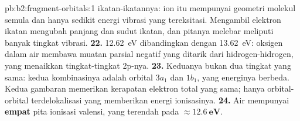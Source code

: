 \begin{solution}{pb:b2:fragment-orbitals:1}
ikatan-ikatannya: ion itu mempunyai geometri molekul semula dan hanya
sedikit energi vibrasi yang tereksitasi. Mengambil elektron ikatan
mengubah panjang dan sudut ikatan, dan pitanya melebar meliputi banyak
tingkat vibrasi.
\textbf{22.} \qty{12.62}{eV} dibandingkan dengan \qty{13.62}{eV}: oksigen
dalam air membawa muatan parsial negatif yang ditarik dari
hidrogen-hidrogen, yang menaikkan tingkat-tingkat 2p-nya.
\textbf{23.} Keduanya bukan dua tingkat yang sama: kedua kombinasinya
adalah orbital $3a_1$ dan $1b_1$, yang energinya berbeda. Kedua gambaran
memerikan kerapatan elektron total yang sama; hanya orbital-orbital
terdelokalisasi yang memberikan energi ionisasinya.
\textbf{24.} Air mempunyai \textbf{empat} pita ionisasi valensi, yang
terendah pada $\boldsymbol{\approx \qty{12.6}{eV}}$.
\end{solution}
